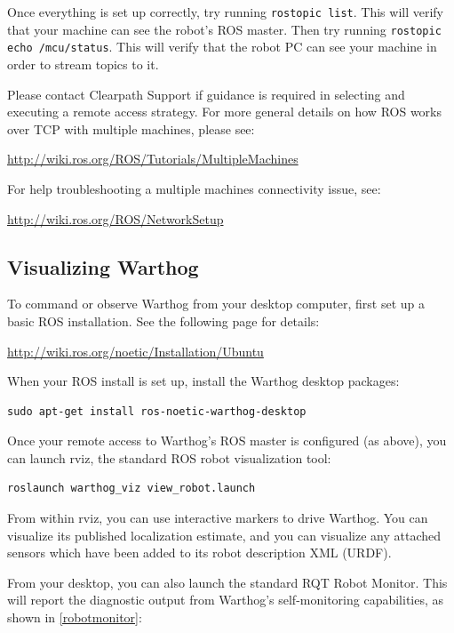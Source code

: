 \documentclass[]{clearpath-latex/clearpath-manual}
\begin{document}
Once everything is set up correctly, try running \lstinline{rostopic list}. This will verify that your machine can see the robot's ROS master. Then try running \lstinline{rostopic echo /mcu/status}. This will verify that the robot PC can see your machine in order to stream topics to it.

Please contact Clearpath Support if guidance is required in selecting and executing a remote access strategy.
For more general details on how ROS works over TCP with multiple machines, please see:

\url{http://wiki.ros.org/ROS/Tutorials/MultipleMachines}

For help troubleshooting a multiple machines connectivity issue, see:

\url{http://wiki.ros.org/ROS/NetworkSetup}

\subsection{Visualizing Warthog}

To command or observe Warthog from your desktop computer, first set up a basic ROS installation.  See the following page for details:

\url{http://wiki.ros.org/noetic/Installation/Ubuntu}

When your ROS install is set up, install the Warthog desktop packages:

\begin{lstlisting}
sudo apt-get install ros-noetic-warthog-desktop
\end{lstlisting}

Once your remote access to Warthog's ROS master is configured (as above), you can launch rviz, the standard ROS robot visualization tool:

\begin{lstlisting}
roslaunch warthog_viz view_robot.launch
\end{lstlisting}

From within rviz, you can use interactive markers to drive Warthog. You can visualize its published localization estimate, and you can visualize any attached sensors which have been added to its robot description XML (URDF).

\pagebreak[4]

From your desktop, you can also launch the standard RQT Robot Monitor. This will report the diagnostic output from Warthog's self-monitoring capabilities, as shown in \autoref{robotmonitor}:
\end{document}
